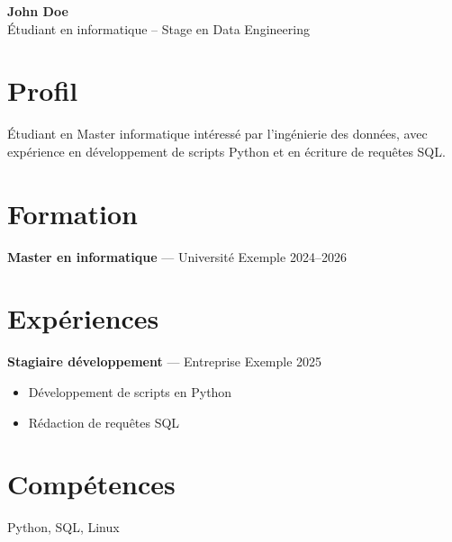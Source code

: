 \documentclass[11pt,a4paper]{article}
\begin{document}
\begin{center}
{\LARGE\bfseries John Doe }\\[3pt]
Étudiant en informatique – Stage en Data Engineering
\end{center}

\section*{Profil}
Étudiant en Master informatique intéressé par l'ingénierie des données, avec expérience en développement de scripts Python et en écriture de requêtes SQL.

\section*{Formation}

\textbf{Master en informatique} --- Université Exemple \hfill 2024–2026\par


\section*{Expériences}

\textbf{Stagiaire développement} --- Entreprise Exemple \hfill 2025\par
\begin{itemize}

\item Développement de scripts en Python

\item Rédaction de requêtes SQL

\end{itemize}


\section*{Compétences}
Python, SQL, Linux
\end{document}
